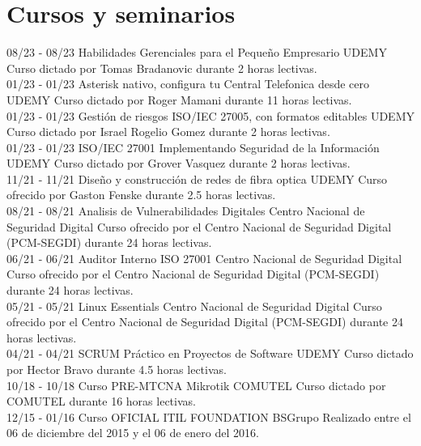 \documentclass[]{friggeri-cv}
\begin{document}
\section{Cursos y seminarios}
\begin{entrylist}
    \entry
    {08/23 - 08/23}
    {Habilidades Gerenciales para el Pequeño Empresario}
    {UDEMY}
    {Curso dictado por Tomas Bradanovic durante 2 horas lectivas.\\}
    \entry
    {01/23 - 01/23}
    {Asterisk nativo, configura tu Central Telefonica desde cero}
    {UDEMY}
    {Curso dictado por Roger Mamani durante 11 horas lectivas.\\}
    \entry
    {01/23 - 01/23}
    {Gestión de riesgos ISO/IEC 27005, con formatos editables}
    {UDEMY}
    {Curso dictado por Israel Rogelio Gomez durante 2 horas lectivas.\\}
    \entry
    {01/23 - 01/23}
    {ISO/IEC 27001 Implementando Seguridad de la Información}
    {UDEMY}
    {Curso dictado por Grover Vasquez durante 2 horas lectivas.\\}
    \entry
    {11/21 - 11/21}
    {Diseño y construcción de redes de fibra optica}
    {UDEMY}
    {Curso ofrecido por Gaston Fenske durante 2.5 horas lectivas.\\}
    \entry
    {08/21 - 08/21}
    {Analisis de Vulnerabilidades Digitales}
    {Centro Nacional de Seguridad Digital}
    {Curso ofrecido por el Centro Nacional de Seguridad Digital (PCM-SEGDI) durante 24 horas lectivas.\\}
    \entry
    {06/21 - 06/21}
    {Auditor Interno ISO 27001}
    {Centro Nacional de Seguridad Digital}
    {Curso ofrecido por el Centro Nacional de Seguridad Digital (PCM-SEGDI) durante 24 horas lectivas.\\}
    \entry
    {05/21 - 05/21}
    {Linux Essentials}
    {Centro Nacional de Seguridad Digital}
    {Curso ofrecido por el Centro Nacional de Seguridad Digital (PCM-SEGDI) durante 24 horas lectivas.\\}
    \entry
    {04/21 - 04/21}
    {SCRUM Práctico en Proyectos de Software}
    {UDEMY}
    {Curso dictado por Hector Bravo durante 4.5 horas lectivas.\\}
    \entry
    {10/18 - 10/18}
    {Curso PRE-MTCNA Mikrotik}
    {COMUTEL}
    {Curso dictado por COMUTEL durante 16 horas lectivas.\\}
    \entry
    {12/15 - 01/16}
    {Curso OFICIAL ITIL FOUNDATION}
    {BSGrupo}
    {Realizado entre el 06 de diciembre del 2015 y el 06 de enero del 2016.\\}
\end{entrylist}
\end{document}
